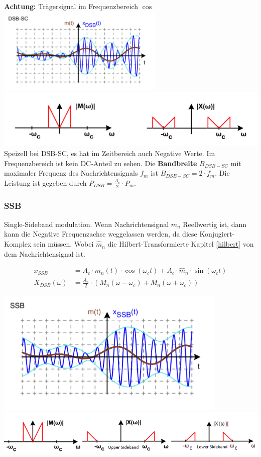 \noindent\textbf{Achtung:} Trägersignal im Frequenzbereich $\cos$ ~\\

\noindent\includegraphics[width=0.4\columnwidth]{Images/dsb_sc} \includegraphics[width=0.6\columnwidth]{Images/dsb_sc_f} \\

\noindent Speizell bei DSB-SC, es hat im Zeitbereich auch Negative Werte. Im Frequenzbereich ist kein DC-Anteil zu sehen. Die \textbf{Bandbreite} $B_{DSB-SC}$ mit maximaler Frequenz des Nachrichtensignals $f_m$ ist $B_{DSB-SC} = 2 \cdot f_m$. Die Leistung ist gegeben durch $P_{DSB} = \frac{A_c}{2}\cdot P_m$.

\subsubsection{SSB}
Single-Sideband modulation. Wenn Nachrichtensignal $m_n$ Reellwertig ist, dann kann die Negative Frequenzachse weggelassen werden, da diese Konjugiert-Komplex sein müssen. Wobei $\hat{m}_n$ die Hilbert-Transformierte Kapitel \ref{hilbert} von dem Nachrichtensignal ist.

\begin{align*}
	x_{SSB} &= A_c \cdot m_n(t) \cdot \cos(\omega_ct) \mp A_c\cdot \hat{m}_n\cdot \sin(\omega_ct) \\
	X_{DSB}(\omega) &= \frac{A_c}{2}\cdot(M_n(\omega - \omega_c) + M_n(\omega + \omega_c))
\end{align*}

\noindent\includegraphics[width=0.3\columnwidth]{Images/ssb} \includegraphics[width=0.7\columnwidth]{Images/ssb_f}\\ 

